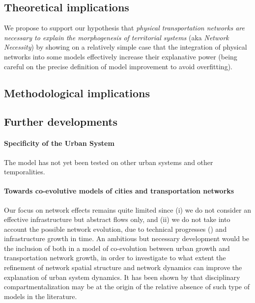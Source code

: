 \documentclass[Royal,sageh,times]{sagej}
\begin{document}
\subsection{Theoretical implications}


We propose to support our hypothesis that \textit{physical transportation networks are necessary to explain the morphogenesis of territorial systems} (aka \textit{Network Necessity}) by showing on a relatively simple case that the integration of physical networks into some models effectively increase their explanative power (being careful on the precise definition of model improvement to avoid overfitting).





\subsection{Methodological implications}





\subsection{Further developments}


\paragraph{Specificity of the Urban System}

The model has not yet been tested on other urban systems and other temporalities.



\paragraph{Towards co-evolutive models of cities and transportation networks}

Our focus on network effects remains quite limited since (i) we do not consider an effective infrastructure but abstract flows only, and (ii) we do not take into account the possible network evolution, due to technical progresses (\cite{bretagnolle2000long}) and infrastructure growth in time. An ambitious but necessary development would be the inclusion of both in a model of co-evolution between urban growth and transportation network growth, in order to investigate to what extent the refinement of network spatial structure and network dynamics can improve the explanation of urban system dynamics. It has been shown by \cite{raimbault2016models} that disciplinary compartmentalization may be at the origin of the relative absence of such type of models in the literature.
\end{document}
